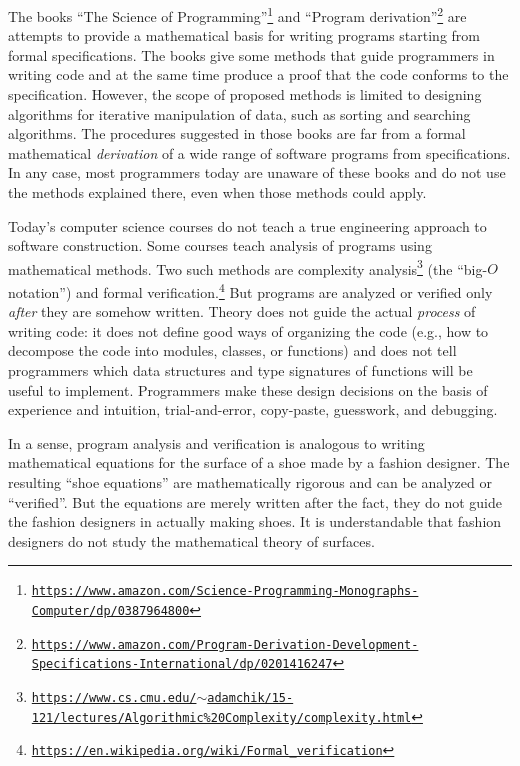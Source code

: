 The books \textsf{``}The Science of Programming\textsf{''}\footnote{\texttt{\href{https://www.amazon.com/Science-Programming-Monographs-Computer/dp/0387964800}{https://www.amazon.com/Science-Programming-Monographs-Computer/dp/0387964800}}}
and \textsf{``}Program derivation\textsf{''}\footnote{\texttt{\href{https://www.amazon.com/Program-Derivation-Development-Specifications-International/dp/0201416247}{https://www.amazon.com/Program-Derivation-Development-Specifications-International/dp/0201416247}}}
are attempts to provide a mathematical basis for writing programs
starting from formal specifications. The books give some methods that
guide programmers in writing code and at the same time produce a proof
that the code conforms to the specification. However, the scope of
proposed methods is limited to designing algorithms for iterative
manipulation of data, such as sorting and searching algorithms. The
procedures suggested in those books are far from a formal mathematical
\emph{derivation} of a wide range of software programs from specifications.
In any case, most programmers today are unaware of these books and
do not use the methods explained there, even when those methods could
apply.

Today\textsf{'}s computer science courses do not teach a true engineering approach
to software construction. Some courses teach analysis of programs
using mathematical methods. Two such methods are complexity analysis\footnote{\texttt{\href{https://www.cs.cmu.edu/~adamchik/15-121/lectures/Algorithmic\%20Complexity/complexity.html}{https://www.cs.cmu.edu/$\sim$adamchik/15-121/lectures/Algorithmic\%20Complexity/complexity.html}}}
(the \textsf{``}big-$O$ notation\textsf{''}) and formal verification.\footnote{\texttt{\href{https://en.wikipedia.org/wiki/Formal_verification}{https://en.wikipedia.org/wiki/Formal\_verification}}}
But programs are analyzed or verified only \emph{after} they are somehow
written. Theory does not guide the actual \emph{process} of writing
code: it does not define good ways of organizing the code (e.g., how
to decompose the code into modules, classes, or functions) and does
not tell programmers which data structures and type signatures of
functions will be useful to implement. Programmers make these design
decisions on the basis of experience and intuition, trial-and-error,
copy-paste, guesswork, and debugging. 

In a sense, program analysis and verification is analogous to writing
mathematical equations for the surface of a shoe made by a fashion
designer. The resulting \textsf{``}shoe equations\textsf{''} are mathematically rigorous
and can be analyzed or \textsf{``}verified\textsf{''}. But the equations are merely
written after the fact, they do not guide the fashion designers in
actually making shoes. It is understandable that fashion designers
do not study the mathematical theory of surfaces.

